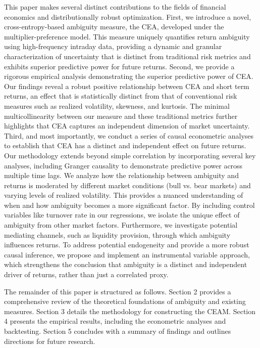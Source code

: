 \documentclass[preprint,12pt,authoryear]{elsarticle}
\begin{document}
This paper makes several distinct contributions to the fields of financial economics and distributionally robust optimization. First, we introduce a novel, cross-entropy-based ambiguity measure, the CEA, developed under the multiplier-preference model. This measure uniquely quantifies return ambiguity using high-frequency intraday data, providing a dynamic and granular characterization of uncertainty that is distinct from traditional risk metrics and exhibits superior predictive power for future returns. Second, we provide a rigorous empirical analysis demonstrating the superior predictive power of CEA. Our findings reveal a robust positive relationship between CEA and short term returns, an effect that is statistically distinct from that of conventional risk measures such as realized volatility, skewness, and kurtosis. The minimal multicollinearity between our measure and these traditional metrics further highlights that CEA captures an independent dimension of market uncertainty. Third, and most importantly, we conduct a series of causal econometric analyses to establish that CEA has a distinct and independent effect on future returns. Our methodology extends beyond simple correlation by incorporating several key analyses, including Granger causality to demonstrate predictive power across multiple time lags. We analyze how the relationship between ambiguity and returns is moderated by different market conditions (bull vs. bear markets) and varying levels of realized volatility. This provides a nuanced understanding of when and how ambiguity becomes a more significant factor. By including control variables like turnover rate in our regressions, we isolate the unique effect of ambiguity from other market factors. Furthermore, we investigate potential mediating channels, such as liquidity provision, through which ambiguity influences returns. To address potential endogeneity and provide a more robust causal inference, we propose and implement an instrumental variable approach, which strengthens the conclusion that ambiguity is a distinct and independent driver of returns, rather than just a correlated proxy. 

The remainder of this paper is structured as follows. Section 2 provides a comprehensive review of the theoretical foundations of ambiguity and existing measures. Section 3 details the methodology for constructing the CEAM. Section 4 presents the empirical results, including the econometric analyses and backtesting. Section 5 concludes with a summary of findings and outlines directions for future research.
\end{document}
